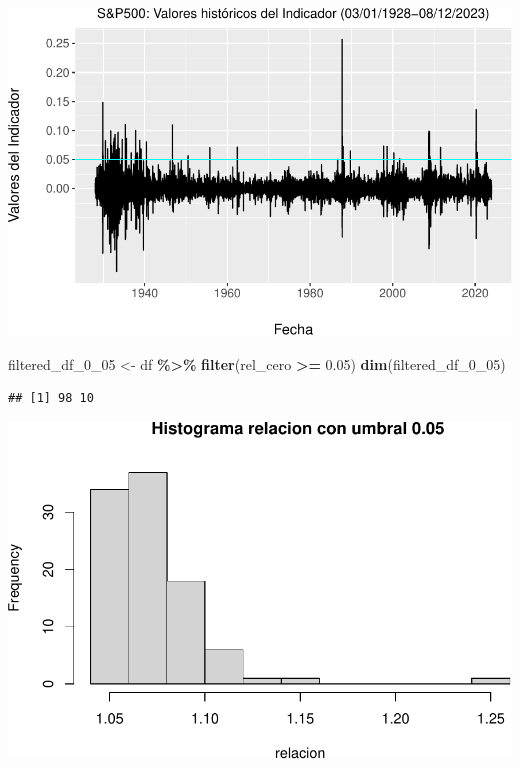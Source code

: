 \documentclass[
  oneside]{article}
\newenvironment{Shaded}{\begin{snugshade}}{\end{snugshade}}
\newcommand{\AttributeTok}[1]{\textcolor[rgb]{0.13,0.29,0.53}{#1}}
\newcommand{\FloatTok}[1]{\textcolor[rgb]{0.00,0.00,0.81}{#1}}
\newcommand{\FunctionTok}[1]{\textcolor[rgb]{0.13,0.29,0.53}{\textbf{#1}}}
\newcommand{\NormalTok}[1]{#1}
\newcommand{\OtherTok}[1]{\textcolor[rgb]{0.56,0.35,0.01}{#1}}
\newcommand{\SpecialCharTok}[1]{\textcolor[rgb]{0.81,0.36,0.00}{\textbf{#1}}}
\newcommand{\StringTok}[1]{\textcolor[rgb]{0.31,0.60,0.02}{#1}}
\begin{document}
\includegraphics{Entrega_Laura_Montaldo_files/figure-latex/unnamed-chunk-19-1.pdf}

\begin{Shaded}
\begin{Highlighting}[]
\NormalTok{filtered\_df\_0\_05 }\OtherTok{\textless{}{-}}\NormalTok{ df }\SpecialCharTok{\%\textgreater{}\%}
  \FunctionTok{filter}\NormalTok{(rel\_cero }\SpecialCharTok{\textgreater{}=} \FloatTok{0.05}\NormalTok{)}
\FunctionTok{dim}\NormalTok{(filtered\_df\_0\_05)}
\end{Highlighting}
\end{Shaded}

\begin{verbatim}
## [1] 98 10
\end{verbatim}

\begin{Shaded}
\end{Shaded}

\includegraphics{Entrega_Laura_Montaldo_files/figure-latex/unnamed-chunk-21-1.pdf}
\end{document}
